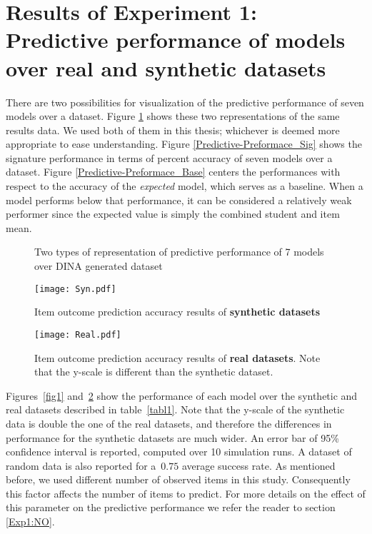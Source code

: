 \section{Results of Experiment 1: Predictive performance of models over real and synthetic datasets} \label{secSyn}

There are two possibilities for visualization of the predictive performance of seven models over a dataset. Figure \ref{Fig:Predictive-Preformace_rep} shows these two representations of the same results data. We used both of them in this thesis; whichever is deemed more appropriate to ease understanding. Figure \ref{Predictive-Preformace_Sig} shows the signature performance in terms of percent accuracy of seven models over a dataset. Figure \ref{Predictive-Preformace_Base} centers the performances with respect to the accuracy of the \textit{expected} model, which serves as a baseline. When a model performs below that performance, it can be considered a relatively weak performer since the expected value is simply the combined student and item mean.

\begin{figure}[h]
\centering
 \quad
{}
\caption{Two types of representation of predictive performance of 7 models over DINA generated dataset}
\label{Fig:Predictive-Preformace_rep}
\end{figure}


\begin{figure}
\centering
\texttt{[image: Syn.pdf]}
\caption{Item outcome prediction accuracy results of {\textbf{synthetic datasets}}}
\label{fig1}

{\texttt{[image: Real.pdf]}}
\caption{Item outcome prediction accuracy results of {\textbf{real datasets}}. Note that the y-scale is different than the synthetic dataset.}
\label{fig2}
\end{figure}


Figures~\ref{fig1} and~\ref{fig2} show the performance of each model over the synthetic and real datasets described in table~\ref{tabl1}. Note that the y-scale of the synthetic data is double the one of the real datasets, and therefore the differences in performance for the synthetic datasets are much wider. An error bar of 95\% confidence interval is reported, computed over 10 simulation runs. A dataset of random data is also reported for a~$0.75$ average success rate. As mentioned before, we used different number of observed items in this study. Consequently this factor affects the number of items to predict. For more details on the effect of this parameter on the predictive performance we refer the reader to section \ref{Exp1:NO}.


